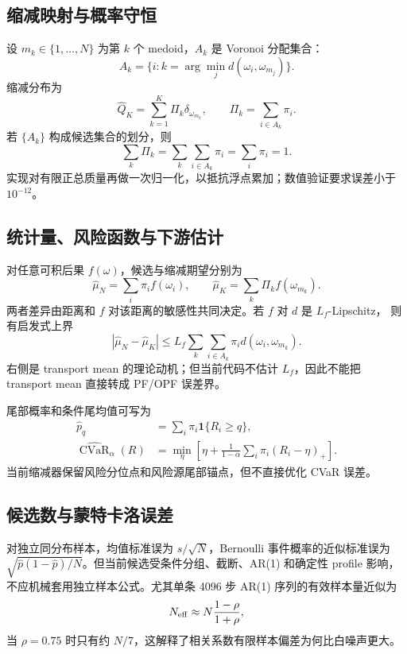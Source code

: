 \subsection{缩减映射与概率守恒}
设 $m_k\in\{1,\dots,N\}$ 为第 $k$ 个 medoid，$A_k$ 是 Voronoi 分配集合：
\begin{equation}
 A_k=\{i:k=\arg\min_j d(\omega_i,\omega_{m_j})\}.
\end{equation}
缩减分布为
\begin{equation}
 \widehat Q_K=\sum_{k=1}^K\Pi_k\delta_{\omega_{m_k}},\qquad
 \Pi_k=\sum_{i\in A_k}\pi_i.
\end{equation}
若 $\{A_k\}$ 构成候选集合的划分，则
\begin{equation}
 \sum_k\Pi_k=\sum_k\sum_{i\in A_k}\pi_i=\sum_i\pi_i=1.
\end{equation}
实现对有限正总质量再做一次归一化，以抵抗浮点累加；数值验证要求误差小于 $10^{-12}$。

\subsection{统计量、风险函数与下游估计}
对任意可积后果 $f(\omega)$，候选与缩减期望分别为
\begin{equation}
 \widehat\mu_N=\sum_i\pi_i f(\omega_i),\qquad
 \widehat\mu_K=\sum_k\Pi_k f(\omega_{m_k}).
\end{equation}
两者差异由距离和 $f$ 对该距离的敏感性共同决定。若 $f$ 对 $d$ 是 $L_f$-Lipschitz，
则有启发式上界
\begin{equation}
 |\widehat\mu_N-\widehat\mu_K|
 \le L_f\sum_k\sum_{i\in A_k}\pi_i d(\omega_i,\omega_{m_k}).
\end{equation}
右侧是 transport mean 的理论动机；但当前代码不估计 $L_f$，因此不能把 transport mean
直接转成 PF/OPF 误差界。

尾部概率和条件尾均值可写为
\begin{align}
 \widehat p_q&=\sum_i\pi_i\mathbf1\{R_i\ge q\},\\
 \widehat{\operatorname{CVaR}}_\alpha(R)
 &=\min_\eta\left[\eta+\frac1{1-\alpha}
   \sum_i\pi_i(R_i-\eta)_+\right].
\end{align}
当前缩减器保留风险分位点和风险源尾部锚点，但不直接优化 CVaR 误差。

\subsection{候选数与蒙特卡洛误差}
对独立同分布样本，均值标准误为 $s/\sqrt N$，Bernoulli 事件概率的近似标准误为
$\sqrt{\widehat p(1-\widehat p)/N}$。但当前候选受条件分组、截断、AR(1) 和确定性 profile
影响，不应机械套用独立样本公式。尤其单条 4096 步 AR(1) 序列的有效样本量近似为
\begin{equation}
 N_{\rm eff}\approx N\frac{1-\rho}{1+\rho},
\end{equation}
当 $\rho=0.75$ 时只有约 $N/7$，这解释了相关系数有限样本偏差为何比白噪声更大。

